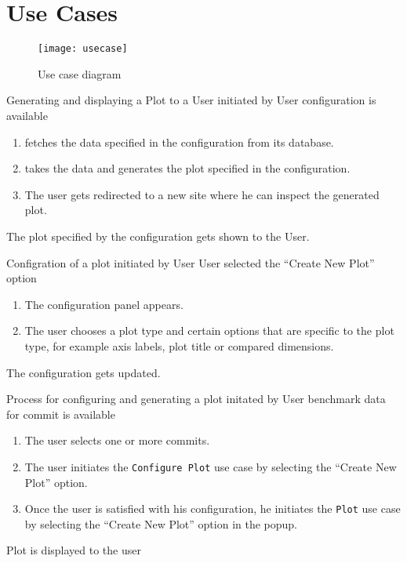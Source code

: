 \section{Use Cases}

\begin{figure}[H]
    \texttt{[image: usecase]}
    \caption{Use case diagram}
    \label{fig:usecase}
\end{figure}

{Generating and displaying a Plot to a User}
{initiated by User}
{\gls{configuration} is available}
{\begin{enumerate}
    \item \parkview{} fetches the data specified in the \gls{configuration} from its database.
    \item \parkview{} takes the data and generates the plot specified in the \gls{configuration}.
    \item The user gets redirected to a new site where he can inspect the generated \gls{plot}.
\end{enumerate}}
{The plot specified by the \gls{configuration} gets shown to the User.}

\bigskip

{Configration of a \gls{plot}}
{initiated by User}
{User selected the \enquote{Create New Plot} option}
{\begin{enumerate}
    \item The \gls{configuration panel} appears.
    \item The user chooses a plot type and certain options that are specific to the plot type, for example axis labels, plot title or compared dimensions.
\end{enumerate}}
{The \gls{configuration} gets updated.}

\bigskip

{Process for configuring and generating a plot}
{initated by User}
{benchmark data for commit is available}
{\begin{enumerate}
    \item The user selects one or more commits.
    \item The user initiates the \texttt{Configure Plot} use case by selecting the \enquote{Create New Plot} option.
    \item Once the user is satisfied with his \gls{configuration}, he initiates the \texttt{Plot} use case by selecting the \enquote{Create New Plot} option in the popup.
\end{enumerate}}
{Plot is displayed to the user}


